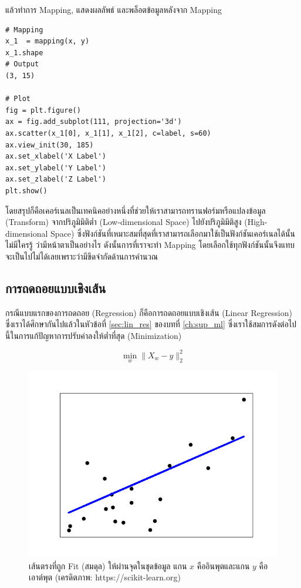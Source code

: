 \vspace{1em}
\noindent แล้วทำการ Mapping, แสดงผลลัพธ์ และพล็อตข้อมูลหลังจาก Mapping

\begin{lstlisting}[style=MyPython]
# Mapping
x_1  = mapping(x, y)
x_1.shape
# Output
(3, 15)

# Plot
fig = plt.figure()
ax = fig.add_subplot(111, projection='3d')
ax.scatter(x_1[0], x_1[1], x_1[2], c=label, s=60)
ax.view_init(30, 185)
ax.set_xlabel('X Label')
ax.set_ylabel('Y Label')
ax.set_zlabel('Z Label')
plt.show()
\end{lstlisting}

\vspace{1em}
โดยสรุปก็คือเคอร์เนลเป็นเทคนิคอย่างหนึ่งที่ช่วยให้เราสามารถทรานฟอร์มหรือแปลงข้อมูล (Transform) จากปริภูมิมิติต่ำ (Low-dimensional 
Space) ไปยังปริภูมิมิติสูง (High-dimensional Space) ซึ่งฟังก์ชันที่เหมาะสมที่สุดที่เราสามารถเลือกมาใช้เป็นฟังก์ชันเคอร์เนลได้นั้นไม่มีใครรู้%
ว่ามีหน้าตาเป็นอย่างไร ดังนั้นการที่เราจะทำ Mapping โดยเลือกใช้ทุกฟังก์ชันนั้นจึงแทบจะเป็นไปไม่ได้เลยเพราะว่ามีขีดจำกัดด้านการคำนวณ

\subsection{การถดถอยแบบเชิงเส้น}
\label{ssec:lin_reg}

กรณีแบบแรกของการถดถอย (Regression) ก็คือการถดถอยแบบเชิงเส้น (Linear Regression) ซึ่งเราได้ศึกษากันไปแล้วในหัวข้อที่ 
\ref{sec:lin_res} ของบทที่ \ref{ch:sup_ml} ซึ่งเราใช้สมการดังต่อไปนี้ในการแก้ปัญหาการปรับค่าลงให้ต่ำที่สุด (Minimization)

\begin{equation}
    \min_{w} \lVert X_{w} - y \rVert_{2}^{2}
\end{equation}

\begin{figure}[htbp]
    \centering
    \includegraphics[width=0.8\linewidth]{fig/plot_linear_regression.png}
    \caption{เส้นตรงที่ถูก Fit (สมดุล) ให้ผ่านจุดในชุดข้อมูล แกน $x$ คืออินพุตและแกน $y$ คือเอาต์พุต (เครดิตภาพ: 
    https://scikit-learn.org)}
    \label{fig:lin_res}
\end{figure}

